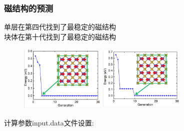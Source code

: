\documentclass[cjk,slidestop,compress,mathserif,blue]{beamer}
\begin{document}
\frame
{
	\frametitle{\textrm{}磁结构的预测}
	单层\textrm{}在第四代找到了最稳定的磁结构\\
	块体\textrm{}在第十代找到了最稳定的磁结构
\begin{figure}[h!]
\vspace*{-0.08in}
\centering
\includegraphics[height=1.25in,width=1.60in]{Figures/FeSe-Generation-1.png}
\hskip 0.5pt
\includegraphics[height=1.25in,width=1.60in]{Figures/FeSe-Generation-2.png}
\label{Fig:FeSe-Generation}
\end{figure}
\centering
计算参数\textrm{input.data}文件设置:\\
}
\end{document}
